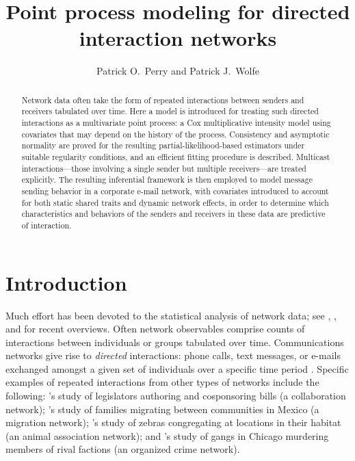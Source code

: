 \documentclass[final]{statsoc}
\title[Point Process Modeling for Directed Interaction Networks]{%
    Point process modeling for directed interaction networks
}
\author[P.\ O.\ Perry and P.\ J.\ Wolfe]{%
    Patrick O.\ Perry and Patrick J.\ Wolfe
}
\begin{document}

\begin{abstract}
Network data often take the form of repeated interactions between senders
and receivers tabulated over time.  Here a model is introduced for treating such directed interactions as a
multivariate point process: a Cox multiplicative intensity model using
covariates that may depend on the history of the process.
Consistency and asymptotic normality are proved for the resulting
partial-likelihood-based estimators under suitable regularity
conditions, and an efficient fitting procedure is described.
Multicast interactions---those involving a single sender
but multiple receivers---are treated explicitly.   
The resulting inferential framework is then employed to model message sending behavior in a corporate e-mail network, with covariates introduced to account for both static shared traits and dynamic network effects, in order to determine which characteristics and behaviors of the senders and receivers in these data are predictive of interaction.


\end{abstract}


\section{Introduction}
\label{S:introduction}

Much effort has been devoted to the statistical analysis of network data;
see \citet{jackson2008social}, \citet{goldenberg2009survey}, and \citet{kolaczyk2009statistical}
for recent overviews.  Often network observables comprise counts of interactions
between individuals or groups tabulated over time.  Communications networks
give rise to \emph{directed} interactions: phone calls, text messages, or
e-mails exchanged amongst a given set of individuals over a specific time
period \citep{tyler2005email,eagle2006reality}.  Specific examples of repeated
interactions from other types of networks include the following:
's \citeyearpar{fowler2006connecting}
study of legislators authoring and cosponsoring bills (a collaboration
network);
's \citeyearpar{mckenzie2007network} study
of families migrating between communities in Mexico (a migration network);
's \citeyearpar{sundaresan2007network}
study of zebras congregating at locations in
their habitat (an animal association network);
and 's \citeyearpar{papachristos2009murder}
study of gangs in Chicago murdering members of rival factions (an organized
crime network).
\end{document}
